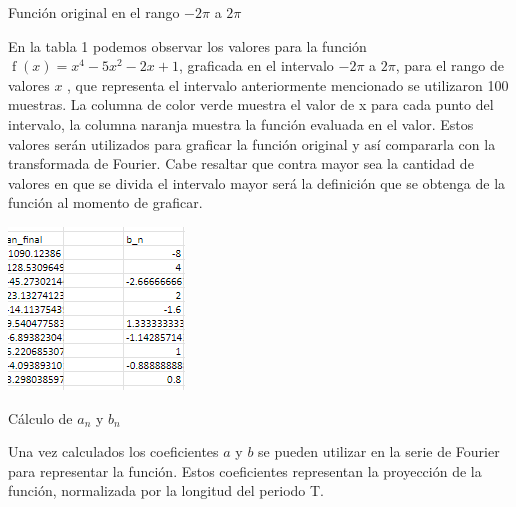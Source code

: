 \begin{table}[H]
    \caption{Función original en el rango \(-2 \pi\) a \(2 \pi\)}
\end{table}

En la tabla 1 podemos observar los valores para la función \(\operatorname{f}(x) = x^4-5x^2-2x+1\), graficada en el intervalo \(-2 \pi\) a \(2 \pi\), para el rango de valores \(x\) , que representa el intervalo anteriormente mencionado se utilizaron 100 muestras. La columna de color verde muestra el valor de x para cada punto del intervalo, la columna naranja muestra la función evaluada en el valor. Estos valores serán utilizados para graficar la función original y así compararla con la transformada de Fourier. Cabe resaltar que contra mayor sea la cantidad de valores en que se divida el intervalo mayor será la definición que se obtenga de la función al momento de graficar.

\begin{table}[H]
    \centering
    \includegraphics[width=1.84375in,height=1.69792in]{media/image1.png}
    \caption{Cálculo de \(a_n\) y \(b_n\)}        
\end{table}

Una vez calculados los coeficientes \(a\) y \(b\) se pueden utilizar en la serie de Fourier para representar la función. Estos coeficientes representan la proyección de la función, normalizada por la longitud del periodo T.

